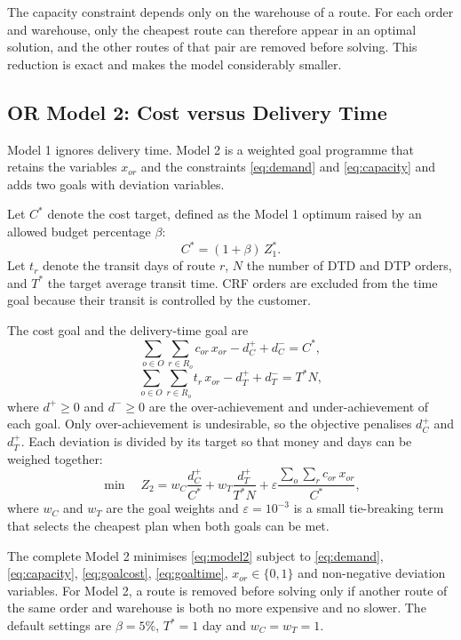\documentclass[conference]{IEEEtran}
\begin{document}
The capacity constraint depends only on the warehouse of a route. For each order and warehouse, only the cheapest route can therefore appear in an optimal solution, and the other routes of that pair are removed before solving. This reduction is exact and makes the model considerably smaller.

\subsection{OR Model 2: Cost versus Delivery Time}
Model 1 ignores delivery time. Model 2 is a weighted goal programme \cite{ignizio} that retains the variables $x_{or}$ and the constraints \eqref{eq:demand} and \eqref{eq:capacity} and adds two goals with deviation variables.

Let $C^{*}$ denote the cost target, defined as the Model 1 optimum raised by an allowed budget percentage $\beta$:
\begin{equation}
C^{*} = (1 + \beta)\, Z_1^{*} .
\end{equation}
Let $t_r$ denote the transit days of route $r$, $N$ the number of DTD and DTP orders, and $T^{*}$ the target average transit time. CRF orders are excluded from the time goal because their transit is controlled by the customer.

The cost goal and the delivery-time goal are
\begin{equation}
\sum_{o \in O} \sum_{r \in R_o} c_{or}\, x_{or} - d_C^{+} + d_C^{-} = C^{*},
\label{eq:goalcost}
\end{equation}
\begin{equation}
\sum_{o \in O} \sum_{r \in R_o} t_r\, x_{or} - d_T^{+} + d_T^{-} = T^{*} N,
\label{eq:goaltime}
\end{equation}
where $d^{+} \ge 0$ and $d^{-} \ge 0$ are the over-achievement and under-achievement of each goal. Only over-achievement is undesirable, so the objective penalises $d_C^{+}$ and $d_T^{+}$. Each deviation is divided by its target so that money and days can be weighed together:
\begin{equation}
\min \quad Z_2 = w_C \frac{d_C^{+}}{C^{*}} + w_T \frac{d_T^{+}}{T^{*} N} + \varepsilon \frac{\sum_{o}\sum_{r} c_{or}\, x_{or}}{C^{*}} ,
\label{eq:model2}
\end{equation}
where $w_C$ and $w_T$ are the goal weights and $\varepsilon = 10^{-3}$ is a small tie-breaking term that selects the cheapest plan when both goals can be met.

The complete Model 2 minimises \eqref{eq:model2} subject to \eqref{eq:demand}, \eqref{eq:capacity}, \eqref{eq:goalcost}, \eqref{eq:goaltime}, $x_{or} \in \{0,1\}$ and non-negative deviation variables. For Model 2, a route is removed before solving only if another route of the same order and warehouse is both no more expensive and no slower. The default settings are $\beta = 5\%$, $T^{*} = 1$ day and $w_C = w_T = 1$.
\end{document}
